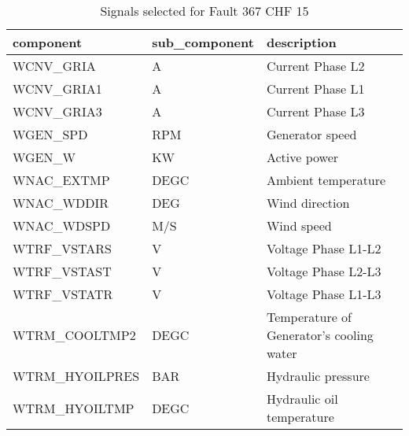 \begin{table}[h!t]
    \centering
    \begin{tabular}{|l|l|l|}
    \hline
        component & sub\_component & description \\ \hline
        WCNV\_GRIA & A & Current Phase L2 \\ \hline
        WCNV\_GRIA1 & A & Current Phase L1 \\ \hline
        WCNV\_GRIA3 & A & Current Phase L3 \\ \hline
        WGEN\_SPD & RPM & Generator speed \\ \hline
        WGEN\_W & KW & Active power \\ \hline
        WNAC\_EXTMP & DEGC & Ambient temperature \\ \hline
        WNAC\_WDDIR & DEG & Wind direction \\ \hline
        WNAC\_WDSPD & M/S & Wind speed \\ \hline
        WTRF\_VSTARS & V & Voltage Phase L1-L2 \\ \hline
        WTRF\_VSTAST & V & Voltage Phase L2-L3 \\ \hline
        WTRF\_VSTATR & V & Voltage Phase L1-L3 \\ \hline
        WTRM\_COOLTMP2 & DEGC & Temperature of Generator's cooling water \\ \hline
        WTRM\_HYOILPRES & BAR & Hydraulic pressure \\ \hline
        WTRM\_HYOILTMP & DEGC & Hydraulic oil temperature \\ \hline
    \end{tabular}
    \caption{Signals selected for Fault 367 CHF 15}
\end{table}

